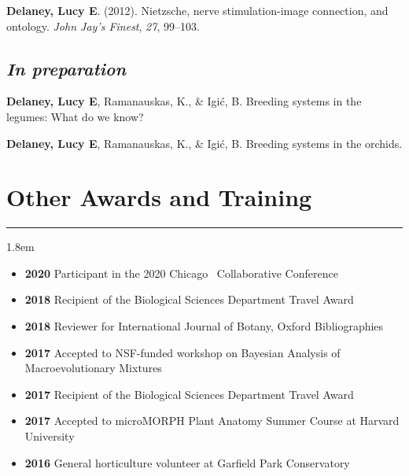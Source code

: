 \documentclass[]{article}
\newlength{\cslhangindent}
\newenvironment{cslreferences}
{\setlength{\parindent}{0pt}
\everypar{\setlength{\hangindent}{\cslhangindent}}\ignorespaces}
{\par}
\begin{document}
\begin{cslreferences}
\textbf{Delaney, Lucy E}. (2012). Nietzsche, nerve stimulation-image connection, and ontology. \emph{John Jay's Finest}, \emph{27}, 99--103. \href{https://ledelaney.org/static/docs/Delaney-JJAYFinest.pdf}{\faFile}\\
\end{cslreferences}

\subsection{\textit{In preparation}}
\vspace{2mm}

\begin{cslreferences}
\textbf{Delaney, Lucy E}, Ramanauskas, K., \& Igić, B. Breeding systems in the legumes: What do we know?

\textbf{Delaney, Lucy E}, Ramanauskas, K., \& Igić, B. Breeding systems in the orchids.\\
\end{cslreferences}

\section{Other Awards and Training}
\hrule
\vspace{4mm}
\leftskip 1.8em

\begin{itemize}[label=$\mathwitch*$]
\item{\textbf{2020} Participant in the 2020 Chicago \textcolor{light-gray}{\faRProject}\ Collaborative Conference \href{https://chircollab.github.io/}{\faLink}}
\item{\textbf{2018} Recipient of the Biological Sciences Department Travel Award}
\item{\textbf{2018} Reviewer for International Journal of Botany, Oxford Bibliographies}
\item{\textbf{2017} Accepted to NSF-funded workshop on Bayesian Analysis of Macroevolutionary Mixtures \href{http://bamm-project.org/index.html}{\faLink}}
\item{\textbf{2017} Recipient of the Biological Sciences Department Travel Award}
\item{\textbf{2017} Accepted to microMORPH Plant Anatomy Summer Course at Harvard University \href{https://web.archive.org/web/20170922060558/http://arboretum.harvard.edu/tracing-evolution-form-function/"}{\faLink}}
\item{\textbf{2016} General horticulture volunteer at Garfield Park Conservatory \href{https://garfieldconservatory.org/}{\faLink}}
\end{itemize}
\end{document}
